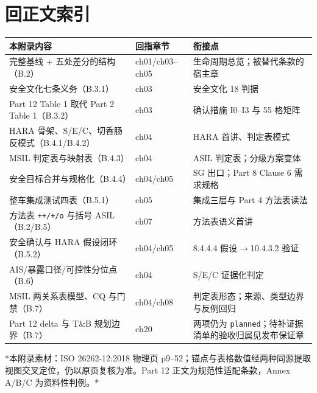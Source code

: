 \section{回正文索引}

\begingroup\small
\setlength{\tabcolsep}{4pt}
\begin{xltabular}{\linewidth}{@{}XXX@{}}
\toprule
本附录内容 & 回指章节 & 衔接点 \\
\midrule
\endhead
完整基线 + 五处差分的结构（B.2） & ch01/ch03–ch05 & 生命周期总览；被替代条款的宿主章 \\
安全文化七条义务（B.3.1） & ch03 & 安全文化 18 判据 \\
Part 12 Table 1 取代 Part 2 Table 1（B.3.2） & ch03 & 确认措施 I0–I3 与 55 格矩阵 \\
HARA 骨架、S/E/C、切香肠反模式（B.4.1/B.4.2） & ch04 & HARA 首讲、判定表模式 \\
MSIL 判定表与映射表（B.4.3） & ch04 & ASIL 判定表；分级方案变体 \\
安全目标合并与规格化（B.4.4） & ch04/ch05 & SG 出口；Part 8 Clause 6 需求规格 \\
整车集成测试四表（B.5.1） & ch05 & 集成三层与 Part 4 方法表读法 \\
方法表 \nolinkurl{++/+/o} 与括号 ASIL（B.2/B.5） & ch07 & 方法表语义首讲 \\
安全确认与 HARA 假设闭环（B.5.2） & ch04/ch05 & 8.4.4.4 假设\(\rightarrow\)10.4.3.2 验证 \\
AIS/暴露口径/可控性分位点（B.6） & ch04 & S/E/C 证据化判定 \\
MSIL 两关系表模型、CQ 与门禁（B.7） & ch04/ch08 & 判定表形态；来源、类型边界与反例回归 \\
Part 12 delta 与 T\&B 规划边界（B.7） & ch20 & 两项仍为 \nolinkurl{planned}；待补证据清单的验收归属见发布保证章 \\
\bottomrule
\end{xltabular}
\endgroup


*本附录素材：ISO 26262-12:2018 物理页 p9–52；锚点与表格数值经两种同源提取视图交叉定位，仍以原页复核为准。Part 12 正文为规范性适配条款，Annex A/B/C 为资料性判例。*
